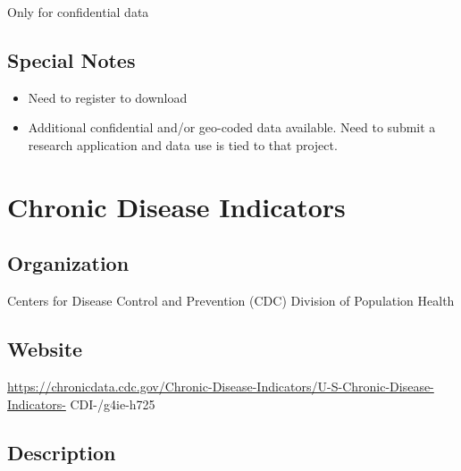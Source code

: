 \documentclass[
]{book}
\providecommand{\tightlist}{%
  \setlength{\itemsep}{0pt}\setlength{\parskip}{0pt}}
\begin{document}
Only for confidential data

\hypertarget{special-notes-14}{%
\section{Special Notes}\label{special-notes-14}}

\begin{itemize}
\tightlist
\item
  Need to register to download
\item
  Additional confidential and/or geo-coded data available. Need to submit a research application and data use is tied to that project.
\end{itemize}

\mainmatter

\hypertarget{chronic-disease-indicators}{%
\chapter{Chronic Disease Indicators}\label{chronic-disease-indicators}}

\hypertarget{organization-15}{%
\section{Organization}\label{organization-15}}

Centers for Disease Control and Prevention (CDC) Division of Population Health

\hypertarget{website-15}{%
\section{Website}\label{website-15}}

\url{https://chronicdata.cdc.gov/Chronic-Disease-Indicators/U-S-Chronic-Disease-Indicators-} CDI-/g4ie-h725

\hypertarget{description-15}{%
\section{Description}\label{description-15}}
\end{document}
